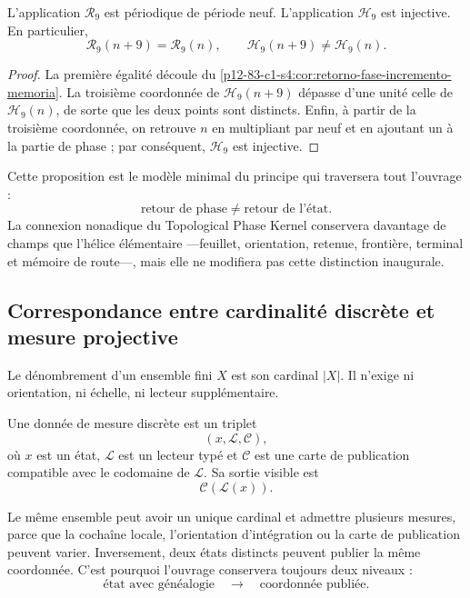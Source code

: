 \begin{proposition}
\label{p12-83-c1-s4:prop:rueda-no-determina-estado}
L’application \(\mathcal R_9\) est périodique de période neuf. L’application
\(\mathcal H_9\) est injective. En particulier,
\[
 \mathcal R_9(n+9)=\mathcal R_9(n),
 \qquad
 \mathcal H_9(n+9)\neq\mathcal H_9(n).
\]
\end{proposition}

\begin{proof}
La première égalité découle du
\cref{p12-83-c1-s4:cor:retorno-fase-incremento-memoria}. La troisième coordonnée de
\(\mathcal H_9(n+9)\) dépasse d’une unité celle de \(\mathcal H_9(n)\),
de sorte que les deux points sont distincts. Enfin, à partir de la troisième coordonnée,
on retrouve \(n\) en multipliant par neuf et en ajoutant un à la partie de phase ;
par conséquent, \(\mathcal H_9\) est injective.
\end{proof}

Cette proposition est le modèle minimal du principe qui traversera tout
l’ouvrage :
\[
 \boxed{\text{retour de phase}\neq\text{retour de l’état}.}
\]
La connexion nonadique du Topological Phase Kernel conservera davantage de champs que
l’hélice élémentaire ---feuillet, orientation, retenue, frontière, terminal et
mémoire de route---, mais elle ne modifiera pas cette distinction inaugurale.

\subsection{Correspondance entre cardinalité discrète et mesure projective}

\begin{definition}[Dénombrement]
Le dénombrement d’un ensemble fini \(X\) est son cardinal \(|X|\). Il n’exige
ni orientation, ni échelle, ni lecteur supplémentaire.
\end{definition}

\begin{definition}
Une donnée de mesure discrète est un triplet
\[
 (x,\mathcal L,\mathcal C),
\]
où \(x\) est un état, \(\mathcal L\) est un lecteur typé et
\(\mathcal C\) est une carte de publication compatible avec le codomaine de
\(\mathcal L\). Sa sortie visible est
\[
 \mathcal C(\mathcal L(x)).
\]
\end{definition}

Le même ensemble peut avoir un unique cardinal et admettre plusieurs mesures,
parce que la cochaîne locale, l’orientation d’intégration ou la
carte de publication peuvent varier. Inversement, deux états distincts peuvent publier la
même coordonnée. C’est pourquoi l’ouvrage conservera toujours deux niveaux :
\[
 \text{état avec généalogie}
 \quad\longrightarrow\quad
 \text{coordonnée publiée}.
\]

